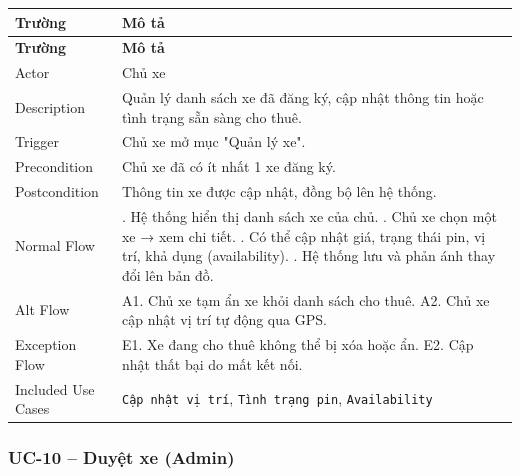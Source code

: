 \begin{longtable}{|>{\raggedright\arraybackslash}p{4cm}|>{\raggedright\arraybackslash}p{11cm}|}
\hline
\textbf{Trường} & \textbf{Mô tả} \\
\hline
\endfirsthead

\hline
\textbf{Trường} & \textbf{Mô tả} \\
\hline
\endhead

\hline
\endfoot

Actor & Chủ xe \\
\hline
Description & Quản lý danh sách xe đã đăng ký, cập nhật thông tin hoặc tình trạng sẵn sàng cho thuê. \\
\hline
Trigger & Chủ xe mở mục "Quản lý xe". \\
\hline
Precondition & Chủ xe đã có ít nhất 1 xe đăng ký. \\
\hline
Postcondition & Thông tin xe được cập nhật, đồng bộ lên hệ thống. \\
\hline
Normal Flow & 1. Hệ thống hiển thị danh sách xe của chủ. \newline 2. Chủ xe chọn một xe → xem chi tiết. \newline 3. Có thể cập nhật giá, trạng thái pin, vị trí, khả dụng (availability). \newline 4. Hệ thống lưu và phản ánh thay đổi lên bản đồ. \\
\hline
Alt Flow & A1. Chủ xe tạm ẩn xe khỏi danh sách cho thuê. \newline A2. Chủ xe cập nhật vị trí tự động qua GPS. \\
\hline
Exception Flow & E1. Xe đang cho thuê không thể bị xóa hoặc ẩn. \newline E2. Cập nhật thất bại do mất kết nối. \\
\hline
Included Use Cases & \texttt{Cập nhật vị trí}, \texttt{Tình trạng pin}, \texttt{Availability} \\
\hline
\end{longtable}

\subsubsection*{UC-10 – Duyệt xe (Admin)}

